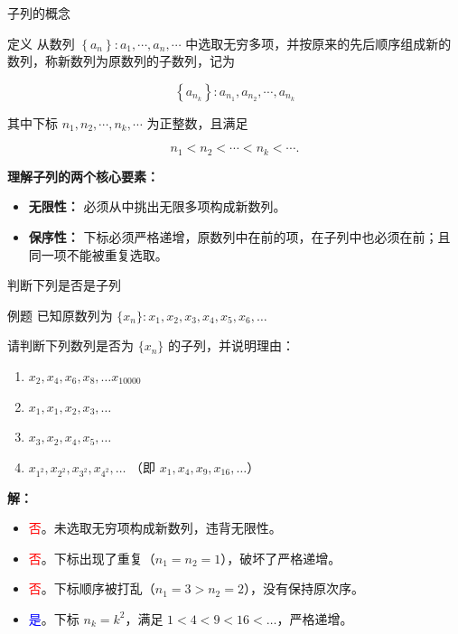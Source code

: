 \documentclass[aspectratio=169,10pt]{ctexbeamer}
\begin{document}
\begin{frame}{子列的概念}
	\begin{block}{定义}
		从数列 $\left\{a_n\right\}: a_1, \cdots, a_n, \cdots$ 中选取无穷多项，并按原来的先后顺序组成新的数列，称新数列为原数列的子数列，记为
		
		$$
		\left\{a_{n_k}\right\}: a_{n_1}, a_{n_2}, \cdots, a_{n_k}
		$$
		
		其中下标 $n_1, n_2, \cdots, n_k, \cdots$ 为正整数，且满足
		
		$$
		n_1<n_2<\cdots<n_k<\cdots .
		$$
	\end{block}
	
	\vspace{0.5cm}
	\textbf{理解子列的两个核心要素：}
	\begin{itemize}
		\item \textbf{无限性：} 必须从中挑出无限多项构成新数列。
		\item \textbf{保序性：} 下标必须严格递增，原数列中在前的项，在子列中也必须在前；且同一项不能被重复选取。
	\end{itemize}
\end{frame}

\begin{frame}{判断下列是否是子列}
	\begin{block}{例题}
		已知原数列为 $\{x_n\} : x_1, x_2, x_3, x_4, x_5, x_6, \dots$

		请判断下列数列是否为 $\{x_n\}$ 的子列，并说明理由：
		
		\vspace{0.3cm}
		\begin{enumerate}
			\item $x_2, x_4, x_6, x_8,\dots x_{10000}$
			\item $x_1, x_1, x_2, x_3, \dots$
			\item $x_3, x_2, x_4, x_5, \dots$
			\item $x_{1^2}, x_{2^2}, x_{3^2}, x_{4^2}, \dots$ （即 $x_1, x_4, x_9, x_{16}, \dots$）
		\end{enumerate}
	
	\end{block}
	
	
	\pause 
	\textbf{解：}
	\begin{itemize}
		\item[1.] \textcolor{red}{否}。未选取无穷项构成新数列，违背无限性。
		\item[2.] \textcolor{red}{否}。下标出现了重复（$n_1 = n_2 = 1$），破坏了严格递增。
		\item[3.] \textcolor{red}{否}。下标顺序被打乱（$n_1=3 > n_2=2$），没有保持原次序。
		\item[4.] \textcolor{blue}{是}。下标 $n_k = k^2$，满足 $1 < 4 < 9 < 16 < \dots$，严格递增。
	\end{itemize}
\end{frame}
\end{document}
